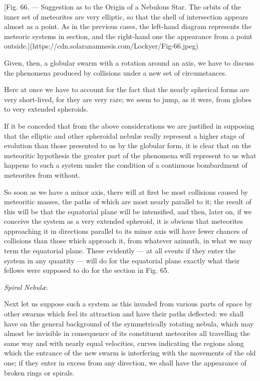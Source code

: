 \documentclass[a4paper, 12pt, oneside, polutonikogreek, english]{article}
\begin{document}
[Fig. 66. --- Suggestion as to the Origin of a Nebulous Star. The orbits of the inner set of meteorites are very elliptic, so that the shell of intersection appears almost as a point. As in the previous cases, the left-hand diagram represents the meteoric systems in section, and the right-hand one the appearance from a point outside.](https://cdn.solaranamnesis.com/Lockyer/Fig-66.jpeg)

Given, then, a globular swarm with a rotation around an axis, we have to discuss the phenomena produced by collisions under a new set of circumstances.

Here at once we have to account for the fact that the nearly spherical forms are very short-lived, for they are very rare; we seem to jump, as it were, from globes to very extended spheroids.

If it be conceded that from the above considerations we are justified in supposing that the elliptic and other spheroidal nebulæ really represent a higher stage of evolution than those presented to us by the globular form, it is clear that on the meteoritic hypothesis the greater part of the phenomena will represent to us what happens to such a system under the condition of a continuous bombardment of meteorites from without.

So soon as we have a minor axis, there will at first be most collisions caused by meteoritic masses, the paths of which are most nearly parallel to it; the result of this will be that the equatorial plane will be intensified, and then, later on, if we conceive the system as a very extended spheroid, it is obvious that meteorites approaching it in directions parallel to its minor axis will have fewer chances of collisions than those which approach it, from whatever azimuth, in what we may term the equatorial plane. These evidently --- at all events if they enter the system in any quantity --- will do for the equatorial plane exactly what their fellows were supposed to do for the section in Fig. 65.

\emph{Spiral Nebulæ.}

Next let us suppose such a system as this invaded from various parts of space by other swarms which feel its attraction and have their paths deflected: we shall have on the general background of the symmetrically rotating nebula, which may almost be invisible in consequence of its constituent meteorites all travelling the same way and with nearly equal velocities, curves indicating the regions along which the entrance of the new swarm is interfering with the movements of the old one; if they enter in excess from any direction, we shall have the appearance of broken rings or spirals.
\end{document}
